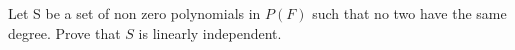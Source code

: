 Let S be a set of non zero polynomials in $P(F)$ such that no two have the same degree. Prove that $S$ is linearly independent.

\begin{tcolorbox}
	\begin{solution}
		
	\end{solution}
\end{tcolorbox}